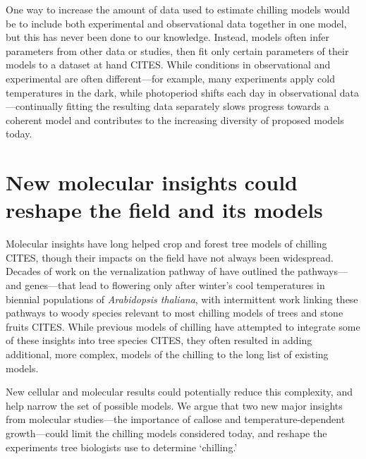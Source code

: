 \documentclass[11pt]{article}
\begin{document}
One way to increase the amount of data used to estimate chilling models would be to include both experimental and observational data together in one model, but this has never been done to our knowledge. Instead, models often infer parameters from other data or studies, then fit only certain parameters of their models to a dataset at hand CITES. While conditions in observational and experimental are often different---for example, many experiments apply cold temperatures in the dark, while photoperiod shifts each day in observational data---continually fitting the resulting data separately slows progress towards a coherent model and contributes to the increasing diversity of proposed models today. 

\section*{New molecular insights could reshape the field and its models} %

Molecular insights have long helped crop and forest tree models of chilling CITES, though their impacts on the field have not always been widespread. Decades of work on the vernalization pathway of  have outlined the pathways---and genes---that lead to flowering only after winter's cool temperatures in biennial populations of \emph{Arabidopsis thaliana}, with intermittent work linking these pathways to woody species relevant to most chilling models of trees and stone fruits CITES. While previous models of chilling have attempted to integrate some of these insights into tree species CITES, they often resulted in adding additional, more complex, models of the chilling to the long list of existing models. 

New cellular and molecular results could potentially reduce this complexity, and help narrow the set of possible models.  We argue that two new major insights from molecular studies---the importance of callose and temperature-dependent growth---could limit the chilling models considered today, and reshape the experiments tree biologists use to determine `chilling.' 
\end{document}
